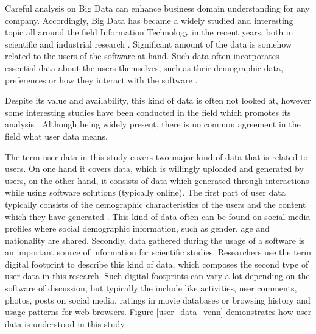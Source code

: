 Careful analysis on Big Data can enhance business domain understanding for any company. Accordingly, Big Data has became a widely studied and interesting topic all around the field Information Technology in the recent years, both in scientific and industrial research \cite{inmon2007tapping, introtodatamining}. Significant amount of the data is somehow related to the users of the software at hand. Such data often incorporates essential data about the users themselves, such as their demographic data, preferences or how they interact with the software 
\cite{jang2015noreciprocity, hu2014we, jang2016teensengagemorewithfewerphotos, han2016teensarefrommars, socialdiversityongithub}. 

Despite its value and availability, this kind of data is often not looked at, however some interesting studies have been conducted in the field which promotes its analysis \cite{jang2016teensengagemorewithfewerphotos}. Although being widely present, there is no common agreement in the field what user data means.

The term user data in this study covers two major kind of data that is related to users. On one hand it covers data, which is willingly uploaded and generated by users, on the other hand, it consists of data which generated through interactions while using software solutions (typically online).
The first part of user data typically consists of the demographic characteristics of the users and the content which they have generated \cite{han2016teensarefrommars}. This kind of data often can be found on social media profiles where social demographic information, such as gender, age and nationality are shared.
Secondly, data gathered during the usage of a software is an important source of information for scientific studies. Researchers use the term digital footprint \cite{youyou2015computer} to describe this kind of data, which composes the second type of user data in this research. Such digital footprints can vary a lot depending on the software of discussion, but typically the include like activities, user comments, photos, posts on social media, ratings in movie databases or browsing history and usage patterns for web browsers. Figure \ref{user_data_venn} demonstrates how user data is understood in this study.

